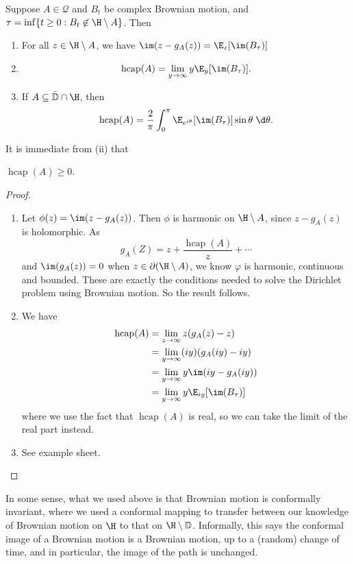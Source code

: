 \documentclass[a4paper]{article}
\renewcommand\D{\mathbb{D}}
\DeclareMathOperator\hcap{hcap}
\begin{document}
\begin{prop}
  Suppose $A \in \mathcal{Q}$ and $B_t$ be complex Brownian motion, and $\tau = \inf\{t \geq 0: B_t \not \in \H \setminus A\}$. Then
  \begin{enumerate}
    \item For all $z \in \H \setminus A$, we have $\im(z - g_A(z)) = \E_z[\im(B_\tau)]$
    \item
      \[
        \hcap(A) = \lim_{y \to \infty} y \E_y[\im(B_\tau)].
      \]
    \item If $A \subseteq \bar{\D} \cap \H$, then
      \[
        \hcap(A) = \frac{2}{\pi} \int_0^\pi \E_{e^{i\theta}}[\im(B_\tau)]\sin \theta \;\d \theta.
      \]
  \end{enumerate}
\end{prop}
It is immediate from (ii) that
\begin{cor}
  $\hcap(A) \geq 0$.
\end{cor}

\begin{proof}\leavevmode
  \begin{enumerate}
    \item Let $\phi(z) = \im(z - g_A(z))$. Then $\phi$ is harmonic on $\H \setminus A$, since $z - g_A(z)$ is holomorphic. As
      \[
        g_A(Z) = z + \frac{\hcap (A)}{z} + \cdots
      \]
      and $\im(g_A(z)) = 0$ when $z \in \partial(\H \setminus A)$, we know $\varphi$ is harmonic, continuous and bounded. These are exactly the conditions needed to solve the Dirichlet problem using Brownian motion. So the result follows.

    \item We have
      \begin{align*}
        \hcap(A) &= \lim_{z \to \infty} z (g_A(z) - z) \\
        &= \lim_{y \to \infty} (iy) (g_A(iy) - iy)\\
        &= \lim_{y \to \infty} y \im (iy - g_A(iy))\\
        &= \lim_{y \to \infty} y \E_{iy} [\im(B_\tau)]
      \end{align*}
      where we use the fact that $\hcap(A)$ is real, so we can take the limit of the real part instead.
    \item See example sheet.\qedhere
  \end{enumerate}
\end{proof}

In some sense, what we used above is that Brownian motion is conformally invariant, where we used a conformal mapping to transfer between our knowledge of Brownian motion on $\H$ to that on $\H \setminus \D$. Informally, this says the conformal image of a Brownian motion is a Brownian motion, up to a (random) change of time, and in particular, the image of the path is unchanged.
\end{document}
